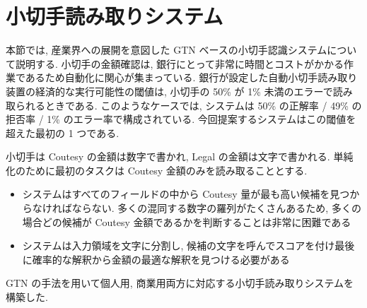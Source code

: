 \documentclass[twocolumn]{jarticle}     %
\begin{document}
\section{小切手読み取りシステム}
本節では, 産業界への展開を意図した GTN ベースの小切手認識システムについて説明する. 
小切手の金額確認は, 銀行にとって非常に時間とコストがかかる作業であるため自動化に関心が集まっている. 銀行が設定した自動小切手読み取り装置の経済的な実行可能性の閾値は, 小切手の 50\% が 1\% 未満のエラーで読み取られるときである. 
このようなケースでは, システムは 50\% の正解率 / 49\% の拒否率 / 1\% のエラー率で構成されている. 
今回提案するシステムはこの閾値を超えた最初の 1 つである.
\par
小切手は Coutesy の金額は数字で書かれ, Legal の金額は文字で書かれる. 単純化のために最初のタスクは Coutesy 金額のみを読み取ることとする. 
\begin{itemize}
  \item システムはすべてのフィールドの中から Coutesy 量が最も高い候補を見つからなければならない. 多くの混同する数字の羅列がたくさんあるため, 多くの場合どの候補が Coutesy 金額であるかを判断することは非常に困難である
  \item システムは入力領域を文字に分割し, 候補の文字を呼んでスコアを付け最後に確率的な解釈から金額の最適な解釈を見つける必要がある
\end{itemize}
GTN の手法を用いて個人用, 商業用両方に対応する小切手読み取りシステムを構築した.
\end{document}
